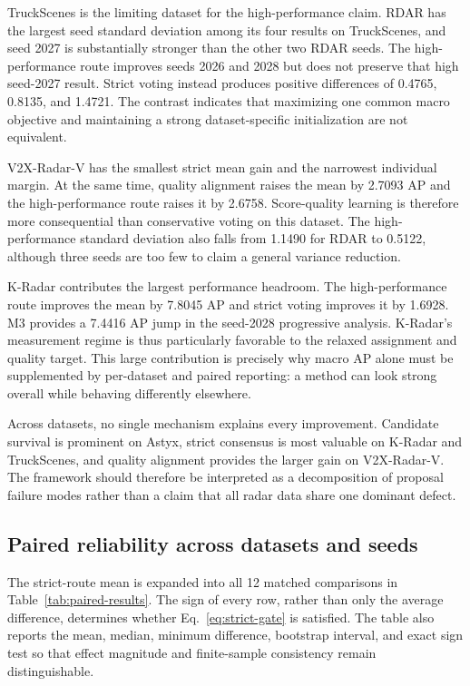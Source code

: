 \documentclass[preprint,12pt,times]{elsarticle}
\newcommand{\tabref}[1]{\textcolor{floatreviewblue}{Table~\ref{#1}}}
\newcommand{\tabref}[1]{Table~\ref{#1}}
\begin{document}
TruckScenes is the limiting dataset for the high-performance claim. RDAR has
the largest seed standard deviation among its four results on TruckScenes, and
seed 2027 is substantially stronger than the other two RDAR seeds. The
high-performance route improves seeds 2026 and 2028 but does not preserve that
high seed-2027 result. Strict voting instead produces positive differences of
0.4765, 0.8135, and 1.4721. The contrast indicates that maximizing one common
macro objective and maintaining a strong dataset-specific initialization are
not equivalent.

V2X-Radar-V has the smallest strict mean gain and the narrowest individual
margin. At the same time, quality alignment raises the mean by 2.7093 AP and
the high-performance route raises it by 2.6758. Score-quality learning is
therefore more consequential than conservative voting on this dataset. The
high-performance standard deviation also falls from 1.1490 for RDAR to 0.5122,
although three seeds are too few to claim a general variance reduction.

K-Radar contributes the largest performance headroom. The high-performance
route improves the mean by 7.8045 AP and strict voting improves it by 1.6928.
M3 provides a 7.4416 AP jump in the seed-2028 progressive analysis. K-Radar's
measurement regime is thus particularly favorable to the relaxed assignment
and quality target. This large contribution is precisely why macro AP alone
must be supplemented by per-dataset and paired reporting: a method can look
strong overall while behaving differently elsewhere.

Across datasets, no single mechanism explains every improvement. Candidate
survival is prominent on Astyx, strict consensus is most valuable on K-Radar
and TruckScenes, and quality alignment provides the larger gain on
V2X-Radar-V. The framework should therefore be interpreted as a decomposition
of proposal failure modes rather than a claim that all radar data share one
dominant defect.

\subsection{Paired reliability across datasets and seeds}

The strict-route mean is expanded into all 12 matched comparisons in
\tabref{tab:paired-results}. The sign of every row, rather than only the
average difference, determines whether Eq.~\eqref{eq:strict-gate} is
satisfied. The table also reports the mean, median, minimum difference,
bootstrap interval, and exact sign test so that effect magnitude and
finite-sample consistency remain distinguishable.
\end{document}
